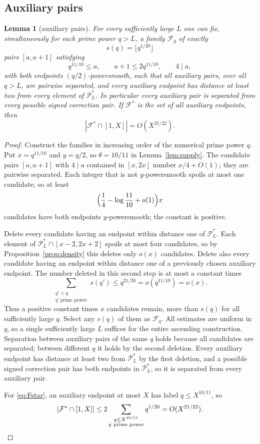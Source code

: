 \documentclass[11pt,letterpaper]{article}
\numberwithin{equation}{section}
\theoremstyle{plain}
\newtheorem{lemma}{Lemma}
\theoremstyle{remark}
\newcommand{\cP}{\mathcal P}
\newcommand{\cF}{\mathcal F}
\begin{document}
\subsection{Auxiliary pairs}\label{sec:aux}

\begin{lemma}[auxiliary pairs]\label{lem:aux}
For every sufficiently large $L$ one can fix, simultaneously for each prime power $q>L$, a family $\cF_q$ of exactly
\[
s(q)=\lfloor q^{1/20}\rfloor
\]
pairs $[a,a+1]$ satisfying
\[
q^{11/10}\le a,\qquad a+1\le2q^{11/10},\qquad 4\mid a,
\]
with both endpoints $(q/2)$-powersmooth, such that all auxiliary pairs, over all $q>L$, are pairwise separated, and every auxiliary endpoint has distance at least two from every element of $\cP^*_L$. In particular every auxiliary pair is separated from every possible signed correction pair. If $\cF^*$ is the set of all auxiliary endpoints, then
\begin{equation}\label{eq:Fstar}
|\cF^*\cap[1,X]|=O(X^{21/22}).
\end{equation}
\end{lemma}

\begin{proof}
Construct the families in increasing order of the numerical prime power $q$. Put $x=q^{11/10}$ and $y=q/2$, so $\theta=10/11$ in Lemma~\ref{lem:supply}. The candidate pairs $[a,a+1]$ with $4\mid a$ contained in $[x,2x]$ number $x/4+O(1)$; they are pairwise separated. Each integer that is not $y$-powersmooth spoils at most one candidate, so at least
\begin{equation}\label{eq:auxcount}
\Bigl(\frac14-\log\frac{11}{10}+o(1)\Bigr)x
\end{equation}
candidates have both endpoints $y$-powersmooth; the constant is positive.

Delete every candidate having an endpoint within distance one of $\cP^*_L$. Each element of $\cP^*_L\cap[x-2,2x+2]$ spoils at most four candidates, so by Proposition~\ref{prop:density} this deletes only $o(x)$ candidates. Delete also every candidate having an endpoint within distance one of a previously chosen auxiliary endpoint. The number deleted in this second step is at most a constant times
\[
\sum_{\substack{q'<q\\ q'\ \text{prime power}}}s(q')\le q^{21/20}=o(q^{11/10})=o(x).
\]
Thus a positive constant times $x$ candidates remain, more than $s(q)$ for all sufficiently large $q$. Select any $s(q)$ of them as $\cF_q$. All estimates are uniform in $q$, so a single sufficiently large $L$ suffices for the entire ascending construction. Separation between auxiliary pairs of the same $q$ holds because all candidates are separated; between different $q$ it holds by the second deletion. Every auxiliary endpoint has distance at least two from $\cP^*_L$ by the first deletion, and a possible signed correction pair has both endpoints in $\cP^*_L$, so it is separated from every auxiliary pair.

For \eqref{eq:Fstar}, an auxiliary endpoint at most $X$ has label $q\le X^{10/11}$, so
\[
|\cF^*\cap[1,X]|\le2\sum_{\substack{q\le X^{10/11}\\ q\ \text{prime power}}}q^{1/20}=O(X^{21/22}).
\qedhere
\]
\end{proof}
\end{document}

